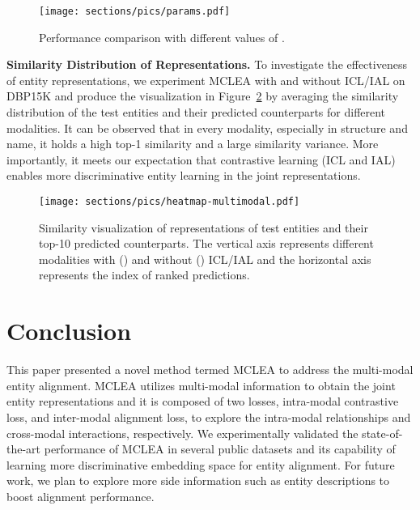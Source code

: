 \documentclass[11pt]{article}
\begin{document}
\begin{figure}[h]
    \centering
    \texttt{[image: sections/pics/params.pdf]}
    \caption{Performance comparison with different values of .}
    \label{fig:params}
\end{figure}

\noindent\textbf{Similarity Distribution of Representations.}
To investigate the effectiveness of entity representations, we experiment MCLEA with and without ICL/IAL on DBP15K and produce the visualization in Figure~\ref{fig:sim-dist} by averaging the similarity distribution of the test entities and their predicted counterparts for different modalities.
It can be observed that in every modality, especially in structure and name, it holds a high top-1 similarity and a large similarity variance.
More importantly, it meets our expectation that contrastive learning (ICL and IAL) enables more discriminative entity learning in the joint representations.

\begin{figure}[h]
    \centering
    \texttt{[image: sections/pics/heatmap-multimodal.pdf]}
    \caption{Similarity visualization of representations of test entities and their top-10 predicted counterparts. The vertical axis represents different modalities with () and without () ICL/IAL and the horizontal axis represents the index of ranked predictions.}
    \label{fig:sim-dist}
\end{figure} 
 \section{Conclusion}



This paper presented a novel method termed MCLEA to address the multi-modal entity alignment.
MCLEA utilizes multi-modal information to obtain the joint entity representations and it is composed of two losses, intra-modal contrastive loss, and inter-modal alignment loss, to explore the intra-modal relationships and cross-modal interactions, respectively.
We experimentally validated the state-of-the-art performance of MCLEA in several public datasets and its capability of learning more discriminative embedding space for entity alignment.
For future work, we plan to explore more side information such as entity descriptions to boost alignment performance.

%
 




\balance

\end{document}
